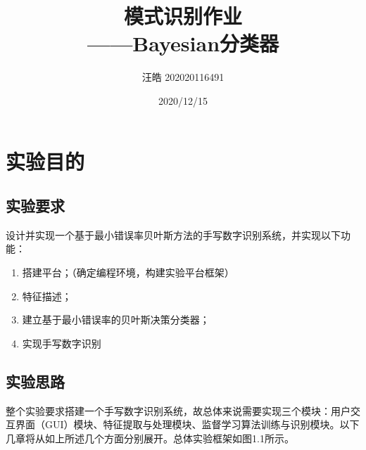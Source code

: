 \documentclass[UTF8, a4paper, 12pt]{report}
\title{模式识别作业\\——Bayesian分类器}
\author{汪皓 202020116491}
\date{2020/12/15}
\begin{document}
\maketitle %
\thispagestyle{empty} %
\clearpage %

\pagestyle{plain} %
\setcounter{page}{1} %
\tableofcontents %
\clearpage

\pagestyle{fancy} %
\setcounter{page}{1} %

\chapter{实验目的}
	\section{实验要求}
		设计并实现一个基于最小错误率贝叶斯方法的手写数字识别系统，并实现以下功能：
		\begin{enumerate}[itemindent=1em]
			\renewcommand{\labelenumi}{\theenumi)}
			\item 搭建平台；（确定编程环境，构建实验平台框架）
			\item 特征描述；
			\item 建立基于最小错误率的贝叶斯决策分类器；
			\item 实现手写数字识别
		\end{enumerate}

	\section{实验思路}
		整个实验要求搭建一个手写数字识别系统，故总体来说需要实现三个模块：用户交互界面（GUI）模块、特征提取与处理模块、监督学习算法训练与识别模块。以下几章将从如上所述几个方面分别展开。总体实验框架如图1.1所示。
\end{document}
